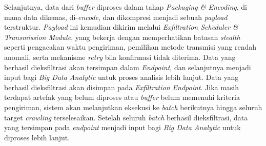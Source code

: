 Selanjutnya, data dari \textit{buffer} diproses dalam tahap \textit{Packaging \& Encoding}, 
di mana data dikemas, di-\textit{encode}, dan dikompresi menjadi sebuah \textit{payload} 
terstruktur. \textit{Payload} ini kemudian dikirim melalui 
\textit{Exfiltration Scheduler \& Transmission Module}, yang bekerja dengan memperhatikan 
batasan \textit{stealth} seperti pengacakan waktu pengiriman, pemilihan metode transmisi 
yang rendah anomali, serta mekanisme \textit{retry} bila konfirmasi tidak diterima. Data 
yang berhasil dieksfiltrasi akan tersimpan dalam \textit{Endpoint}, dan selanjutnya 
menjadi input bagi \textit{Big Data Analytic} untuk proses analisis lebih lanjut.
Data yang berhasil dieksfiltrasi akan disimpan pada \textit{Exfiltration Endpoint}. 
Jika masih terdapat artefak yang belum diproses atau \textit{buffer} belum memenuhi kriteria 
pengiriman, sistem akan melanjutkan eksekusi ke \textit{batch} berikutnya hingga seluruh 
target \textit{crawling} terselesaikan. Setelah seluruh \textit{batch} berhasil dieksfiltrasi, 
data yang tersimpan pada \textit{endpoint} menjadi input bagi \textit{Big Data Analytic} untuk 
diproses lebih lanjut.